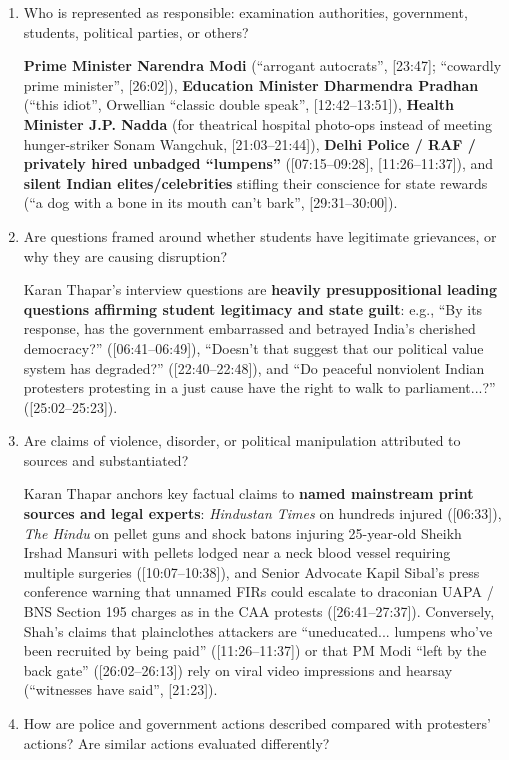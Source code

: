 \documentclass[10pt,a4paper]{article}
\begin{document}
{\begin{enumerate}[leftmargin=1.5em, itemsep=6pt, topsep=4pt]
  \item Who is represented as responsible: examination authorities, government, students, political parties, or others?\par\smallskip
  \textbf{Prime Minister Narendra Modi} (``arrogant autocrats'', [23:47]; ``cowardly prime minister'', [26:02]), \textbf{Education Minister Dharmendra Pradhan} (``this idiot'', Orwellian ``classic double speak'', [12:42--13:51]), \textbf{Health Minister J.P. Nadda} (for theatrical hospital photo-ops instead of meeting hunger-striker Sonam Wangchuk, [21:03--21:44]), \textbf{Delhi Police / RAF / privately hired unbadged ``lumpens''} ([07:15--09:28], [11:26--11:37]), and \textbf{silent Indian elites/celebrities} stifling their conscience for state rewards (``a dog with a bone in its mouth can't bark'', [29:31--30:00]).
  \item Are questions framed around whether students have legitimate grievances, or why they are causing disruption?\par\smallskip
  Karan Thapar's interview questions are \textbf{heavily presuppositional leading questions affirming student legitimacy and state guilt}: e.g., ``By its response, has the government embarrassed and betrayed India's cherished democracy?'' ([06:41--06:49]), ``Doesn't that suggest that our political value system has degraded?'' ([22:40--22:48]), and ``Do peaceful nonviolent Indian protesters protesting in a just cause have the right to walk to parliament...?'' ([25:02--25:23]).
  \item Are claims of violence, disorder, or political manipulation attributed to sources and substantiated?\par\smallskip
  Karan Thapar anchors key factual claims to \textbf{named mainstream print sources and legal experts}: \emph{Hindustan Times} on hundreds injured ([06:33]), \emph{The Hindu} on pellet guns and shock batons injuring 25-year-old Sheikh Irshad Mansuri with pellets lodged near a neck blood vessel requiring multiple surgeries ([10:07--10:38]), and Senior Advocate Kapil Sibal's press conference warning that unnamed FIRs could escalate to draconian UAPA / BNS Section 195 charges as in the CAA protests ([26:41--27:37]). Conversely, Shah's claims that plainclothes attackers are ``uneducated... lumpens who've been recruited by being paid'' ([11:26--11:37]) or that PM Modi ``left by the back gate'' ([26:02--26:13]) rely on viral video impressions and hearsay (``witnesses have said'', [21:23]).
  \item How are police and government actions described compared with protesters' actions? Are similar actions evaluated differently?\par\smallskip

\end{enumerate}}
\end{document}
